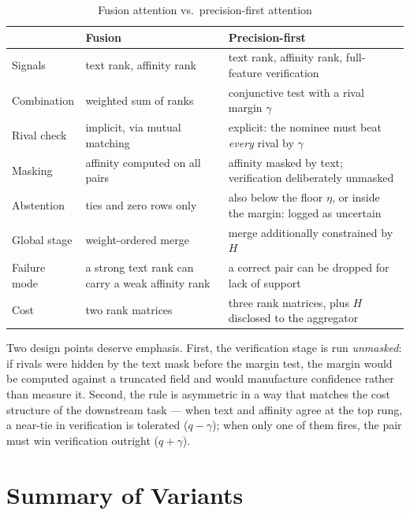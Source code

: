 \documentclass[conference]{IEEEtran}
\begin{document}
\begin{table}[t]
\caption{Fusion attention vs.\ precision-first attention}
\label{tab:precision}
\centering
\small
\begin{tabular}{@{}p{}p{}p{}@{}}
\toprule
 & \textbf{Fusion} & \textbf{Precision-first} \\
\midrule
Signals & text rank, affinity rank & text rank, affinity rank, full-feature verification \\
Combination & weighted sum of ranks & conjunctive test with a rival margin $\gamma$ \\
Rival check & implicit, via mutual matching & explicit: the nominee must beat \emph{every} rival by $\gamma$ \\
Masking & affinity computed on all pairs & affinity masked by text; verification deliberately unmasked \\
Abstention & ties and zero rows only & also below the floor $\eta$, or inside the margin: logged as uncertain \\
Global stage & weight-ordered merge & merge additionally constrained by $H$ \\
Failure mode & a strong text rank can carry a weak affinity rank & a correct pair can be dropped for lack of support \\
Cost & two rank matrices & three rank matrices, plus $H$ disclosed to the aggregator \\
\bottomrule
\end{tabular}
\end{table}

Two design points deserve emphasis. First, the verification stage is run
\emph{unmasked}: if rivals were hidden by the text mask before the margin
test, the margin would be computed against a truncated field and would
manufacture confidence rather than measure it. Second, the rule is
asymmetric in a way that matches the cost structure of the downstream
task --- when text and affinity agree at the top rung, a near-tie in
verification is tolerated ($q-\gamma$); when only one of them fires, the
pair must win verification outright ($q+\gamma$).

\section{Summary of Variants}
\label{sec:summary}
\end{document}
